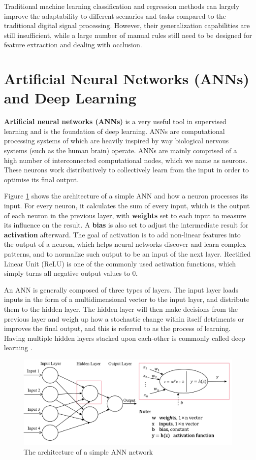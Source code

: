 Traditional machine learning classification and regression methods can largely improve the adaptability to different scenarios and tasks compared to the traditional digital signal processing. However, their generalization capabilities are still insufficient, while a large number of manual rules still need to be designed for feature extraction and dealing with occlusion.


\section{Artificial Neural Networks (ANNs) and Deep Learning}

\textbf{Artificial neural networks (ANNs)} is a very useful tool in supervised learning and is the foundation of deep learning. ANNs are computational processing systems of which are heavily inspired by way biological nervous systems (such as the human brain) operate. ANNs are mainly comprised of a high number of interconnected computational nodes, which we name as neurons. These neurons work distributively to collectively learn from the input in order to optimise its final output.

Figure \ref{fig:6} shows the architecture of a simple ANN and how a neuron processes its input. For every neuron, it calculates the sum of every input, which is the output of each neuron in the previous layer, with \textbf{weights} set to each input to measure its influence on the result. A \textbf{bias} is also set to adjust the intermediate result for \textbf{activation} afterward. The goal of activation is to add non-linear features into the output of a neuron, which helps neural networks discover and learn complex patterns, and to normalize such output to be an input of the next layer. Rectified Linear Unit (ReLU) is one of the commonly used activation functions, which simply turns all negative output values to 0.

An ANN is generally composed of three types of layers. The input layer loads inputs in the form of a multidimensional vector to the input layer, and distribute them to the hidden layer. The hidden layer will then make decisions from the previous layer and weigh up how a stochastic change within itself detriments or improves the final output, and this is referred to as the process of learning. Having multiple hidden layers stacked upon each-other is commonly called deep learning \cite{oshea_introduction_2015}.

\begin{figure}[h]
  \centering
\includegraphics[width=1\textwidth]{Figures/ANN-architecture.png}
  \caption{The architecture of a simple ANN network}
  \label{fig:6}
\end{figure}

